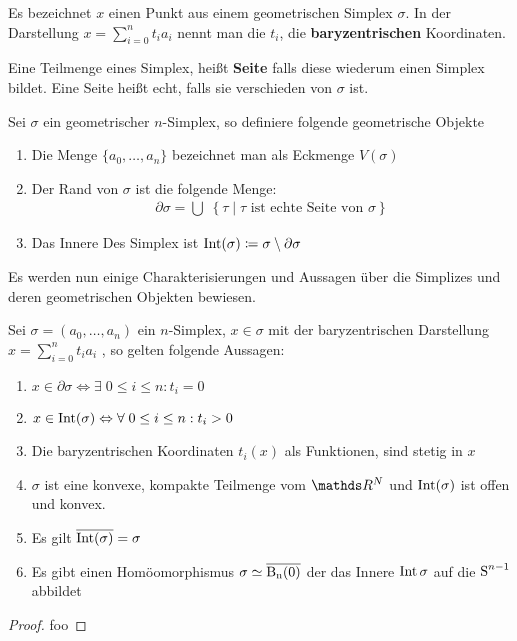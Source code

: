 \begin{Def}
	Es bezeichnet $x$ einen Punkt aus einem geometrischen Simplex $\sigma$. In der Darstellung $x = \sum\limits_{i=0}^n t_i a_i$ 
	nennt man die $t_i$, die \textbf{baryzentrischen} Koordinaten.
	
	Eine Teilmenge eines Simplex, heißt \textbf{Seite} falls diese wiederum einen Simplex bildet. Eine Seite heißt echt, falls sie verschieden von $\sigma$ ist.
\end{Def}

\begin{Def}
	Sei $\sigma$ ein geometrischer $n$-Simplex, so definiere folgende
	geometrische Objekte
	\begin{enumerate}[{\bfseries1)}] 
		\item Die Menge $\{  a_0 , \ldots , a_n \}$ bezeichnet man als Eckmenge $V(\sigma)$
		\item Der Rand von $\sigma$ ist die folgende Menge:
			\begin{gather*}
				\partial\sigma = \bigcup \; \left\{ \tau  \; \Big| \; \tau \text{ ist  echte Seite von } \sigma \right\}
			\end{gather*} 
		\item Das Innere Des Simplex ist $\operatorname{Int}(\sigma) \coloneqq 
		\sigma \setminus \partial\sigma$
	\end{enumerate}
\end{Def}

Es werden nun einige Charakterisierungen und Aussagen über die Simplizes und deren geometrischen Objekten bewiesen.

\begin{Satz}
	\upshape Sei $\sigma = (a_0 , \ldots , a_n)$ ein $n$-Simplex, $x \in \sigma$ mit der baryzentrischen Darstellung $x=\sum\limits_{i=0}^n t_i a_i$ , so gelten folgende Aussagen:
	\begin{enumerate}[1)]%
		\item $x \in \partial\sigma \Leftrightarrow \exists \; 0 \leq i \leq n : t_i = 0$
		\item $x \in \operatorname{Int}(\sigma) \Leftrightarrow \forall \; 0 \leq i \leq n : t_i > 0$
		\item  Die baryzentrischen Koordinaten $t_i(x)$ als Funktionen, sind stetig in $x$
		\item $\sigma$ ist eine konvexe, kompakte Teilmenge vom $\R^N$ und $\operatorname{Int}(\sigma)$ ist offen und konvex.
		\item Es gilt $\overline{\operatorname{Int}(\sigma)} = \sigma$
		\item Es gibt einen Homöomorphismus $\sigma \simeq \operatorname{\overline{\operatorname{B}_n(0)}}$ der 
		das Innere $\operatorname{Int}{\sigma}$ auf die $\operatorname{S}^{n-1}$ abbildet
	\end{enumerate}
	\begin{proof}
		foo
	\end{proof}
\end{Satz}



